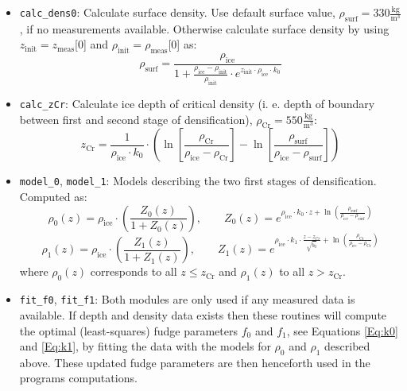 \documentclass[../../CompleteThesis/Complete_1stDraft.tex]{subfiles}
\begin{document}
	\begin{itemize}
		\item \lstinline[columns=fixed]|calc_dens0|:  Calculate surface density. Use default surface value, $\rho_{\text{surf}} = 330 \frac{\text{kg}}{\text{m}^3}$, if no measurements available. Otherwise calculate surface density by using $z_{\text{init}} = z_{\text{meas}}$[0] and $\rho_{\text{init}} = \rho_{\text{meas}}$[0] as:
		\begin{equation}
			\rho_{\text{surf}} = \frac{\rho_{\text{ice}}}{1 + \frac{\rho_{\text{ice}} - \rho_{\text{init}}}{\rho_{\text{init}}}\cdot e^{z_{\text{init}}\cdot \rho_{\text{ice}}\cdot k_0}}
			\label{Eq:rhoSurf}
		\end{equation}
		
		\item \lstinline[columns=fixed]|calc_zCr|: Calculate ice depth of critical density (i. e. depth of boundary between first and second stage of densification), $\rho_{\text{Cr}}=550\frac{\text{kg}}{\text{m}^3}$:
		\begin{equation}
			z_{\text{Cr}} = \frac{1}{\rho_{\text{ice}}\cdot k_0}\cdot\left(\ln \left[\frac{\rho_{\text{Cr}}}{\rho_{\text{ice}} - \rho_{\text{Cr}}}\right]-\ln\left[\frac{\rho_{\text{surf}}}{\rho_{\text{ice}} - \rho_{\text{surf}}}\right]\right)
			\label{Eq:zCr}
		\end{equation}
		
		\item \lstinline[columns=fixed]|model_0|, \lstinline[columns=fixed]|model_1|: Models describing the two first stages of densification. Computed as:
		\begin{equation}
			\rho_0(z) = \rho_{\text{ice}}\cdot \left(\frac{Z_0(z)}{1+Z_0(z)}\right), \qquad Z_0(z) = e^{\rho_{\text{ice}}\cdot k_0 \cdot z + \ln(\frac{\rho_{\text{surf}}}{\rho_{\text{ice}} - \rho_{\text{surf}}})}
			\label{Eq:rhoModel0}
		\end{equation}
		\begin{equation}
			\rho_1(z) = \rho_{\text{ice}}\cdot \left(\frac{Z_1(z)}{1+Z_1(z)}\right), \qquad Z_1(z) = e^{\rho_{\text{ice}}\cdot k_1 \cdot \frac{z - z_{Cr}}{\sqrt{\dot{b}_0}} + \ln(\frac{\rho_{\text{Cr}}}{\rho_{\text{ice}} - \rho_{\text{Cr}}})}
			\label{Eq:rhoModel1}
		\end{equation}
		where $\rho_0(z)$ corresponds to all $z \leq z_{\text{Cr}}$ and $\rho_1(z)$ to all $z > z_{\text{Cr}}$.
		\item \lstinline[columns=fixed]|fit_f0|,  \lstinline[columns=fixed]|fit_f1|: Both modules are only used if any measured data is available. If depth and density data exists then these routines will compute the optimal (least-squares) fudge parameters $f_0$ and $f_1$, see Equations \ref{Eq:k0} and \ref{Eq:k1}, by fitting the data with the models for $\rho_0$ and $\rho_1$ described above. These updated fudge parameters are then henceforth used in the programs computations.
		

\end{itemize}
\end{document}
